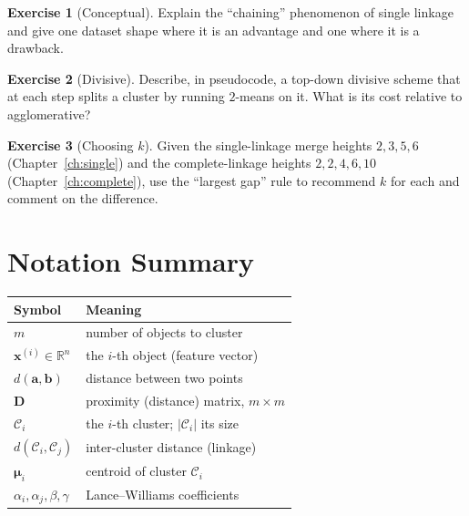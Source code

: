\documentclass[11pt,a4paper]{report}
\theoremstyle{definition}
\newtheorem{exercise}{Exercise}[chapter]
\theoremstyle{plain}
\theoremstyle{remark}
\newcommand{\R}{\mathbb{R}}
\newcommand{\vx}{\mathbf{x}}
\newcommand{\va}{\mathbf{a}}
\newcommand{\vb}{\mathbf{b}}
\newcommand{\C}{\mathcal{C}}
\begin{document}
\begin{exercise}[Conceptual]
Explain the ``chaining'' phenomenon of single linkage and give one dataset
shape where it is an advantage and one where it is a drawback.
\end{exercise}

\begin{exercise}[Divisive]
Describe, in pseudocode, a top-down divisive scheme that at each step splits a
cluster by running $2$-means on it. What is its cost relative to agglomerative?
\end{exercise}

\begin{exercise}[Choosing $k$]
Given the single-linkage merge heights $2,3,5,6$ (Chapter~\ref{ch:single}) and
the complete-linkage heights $2,2,4,6,10$ (Chapter~\ref{ch:complete}), use the
``largest gap'' rule to recommend $k$ for each and comment on the difference.
\end{exercise}

\appendix
\chapter{Notation Summary}
\begin{center}
\begin{tabular}{@{}ll@{}}
\toprule
Symbol & Meaning\\
\midrule
$m$ & number of objects to cluster\\
$\vx^{(i)}\in\R^n$ & the $i$-th object (feature vector)\\
$d(\va,\vb)$ & distance between two points\\
$\mathbf D$ & proximity (distance) matrix, $m\times m$\\
$\C_i$ & the $i$-th cluster; $|\C_i|$ its size\\
$d(\C_i,\C_j)$ & inter-cluster distance (linkage)\\
$\bm\mu_i$ & centroid of cluster $\C_i$\\
$\alpha_i,\alpha_j,\beta,\gamma$ & Lance--Williams coefficients\\
\bottomrule
\end{tabular}
\end{center}
\end{document}

